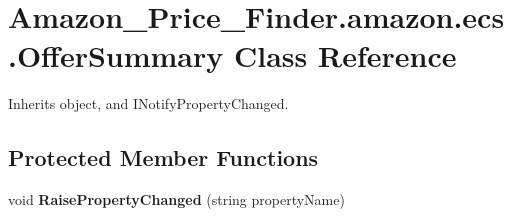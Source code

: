 \hypertarget{class_amazon___price___finder_1_1amazon_1_1ecs_1_1_offer_summary}{\section{Amazon\-\_\-\-Price\-\_\-\-Finder.\-amazon.\-ecs.\-Offer\-Summary Class Reference}
\label{class_amazon___price___finder_1_1amazon_1_1ecs_1_1_offer_summary}
}


 




Inherits object, and I\-Notify\-Property\-Changed.

\subsection*{Protected Member Functions}
\begin{DoxyCompactItemize}
\item 
\hypertarget{class_amazon___price___finder_1_1amazon_1_1ecs_1_1_offer_summary_ab355f29d04ce8ffb9a819beb9b30ffe0}{void {\bfseries Raise\-Property\-Changed} (string property\-Name)}\label{class_amazon___price___finder_1_1amazon_1_1ecs_1_1_offer_summary_ab355f29d04ce8ffb9a819beb9b30ffe0}

\end{DoxyCompactItemize}
